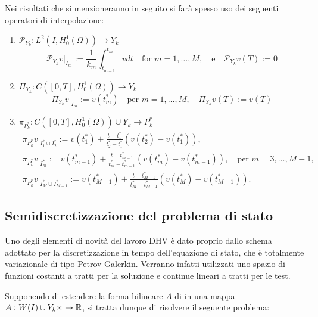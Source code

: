 Nei risultati che si menzioneranno in seguito si farà spesso uso dei seguenti operatori di interpolazione:
\begin{enumerate}
\item $\mathcal{P}_{Y_{k}}:L^2(I,H^1_0(\Omega))\to Y_k$
\[
\mathcal{P}_{Y_{k}} v|_{I_{m}}:=\frac{1}{k_{m}} \int^{t_{m}}_{t_{m-1}}vdt\quad \text{for $m=1,\dots,M$},\quad\text{e}\quad \mathcal{P}_{Y_{k}}v(T):=0
\]
\item $\Pi_{Y_{k}}:C([0,T],H^1_0(\Omega))\to Y_k$
\[
\Pi_{Y_{k}} v|_{I_{m}}:=v(t^*_m)\quad\text{per $m=1,\dots,M$},\quad \Pi_{Y_{k}} v(T):=v(T)
\]
\item $\pi_{P^*_k}:C([0,T],H^1_0(\Omega))\cup Y_k\to P^*_k$
\begin{gather*}
\pi_{P^*_k} v|_{I^*_1\cup I^*_2}:=v(t^*_1)+\frac{t-t^*_1}{t^*_2-t^*_1}(v(t^*_2)-v(t^*_1)),\\
\pi_{P^*_k} v|_{I^*_m}:=v(t^*_{m-1})+\frac{t-t^*_{m-1}}{t^*_{m}-t^*_{m-1}}(v(t^*_m)-v(t^*_{m-1})),\quad\text{per $m=3,\dots,M-1$},\\
\pi_{P^*_k} v|_{I^*_M\cup I^*_{M+1}}:=v(t^*_{M-1})+\frac{t-t^*_{M-1}}{t^*_M-t^*_{M-1}}(v(t^*_M)-v(t^*_{M-1})).
\end{gather*}
\end{enumerate} 


\subsection{Semidiscretizzazione del problema di stato}
Uno degli elementi di novità del lavoro DHV è dato proprio dallo schema adottato per la discretizzazione in tempo dell'equazione di stato, che è totalmente variazionale di tipo Petrov-Galerkin. Verranno infatti utilizzati uno spazio di funzioni costanti a tratti per la soluzione e continue lineari a tratti per le test. 

Supponendo di estendere la forma bilineare $A$ di \cite{MAIN} in una mappa $A:W(I)\cup Y_k\times\to\mathbb{R}$, si tratta dunque di risolvere il seguente problema:

